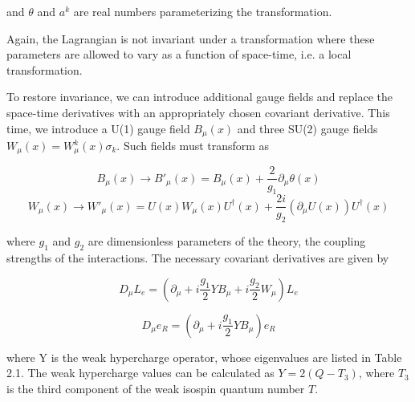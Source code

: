 and $\theta$ and $a^{k}$ are real numbers parameterizing the transformation.

 Again, the Lagrangian is not invariant under a transformation where these parameters are allowed to vary as a function of space-time, i.e. a local transformation.

To restore invariance, we can introduce additional gauge fields and replace the space-time derivatives with an appropriately chosen covariant derivative. This time, we introduce a U(1) gauge field $B_{\mu}(x)$ and three SU(2) gauge fields $W_{\mu}(x)= W_{\mu}^{k}(x)\sigma_{k}$. Such fields must transform as

\begin{equation}
B_{\mu}(x)\rightarrow B'_{\mu}(x) = B_{\mu}(x) + \frac{2}{g_{1}}\partial_{\mu}\theta(x)
\end{equation}
\begin{equation}
W_{\mu}(x)\rightarrow W'_{\mu}(x) = U(x)W_{\mu}(x)U^{\dagger}(x) + \frac{2i}{g_{2}}(\partial_{\mu}U(x))U^{\dagger}(x)
\end{equation}

where $g_{1}$ and $g_{2}$ are dimensionless parameters of the theory, the coupling strengths of the interactions. The necessary covariant derivatives are given by

\begin{equation}
D_{\mu}L_{e} = (\partial_{\mu}+i\frac{g_{1}}{2}YB_{\mu}+i\frac{g_{2}}{2}W_{\mu})L_{e}
\end{equation}

\begin{equation}
D_{\mu}e_{R} = (\partial_{\mu}+i\frac{g_{1}}{2}YB_{\mu})e_{R}
\end{equation}
 
 where Y is the weak hypercharge operator, whose eigenvalues are listed in Table 2.1. The weak hypercharge values can be calculated as $Y=2(Q-T_{3})$, where $T_{3}$ is the third component of the weak isospin quantum number $T$.

